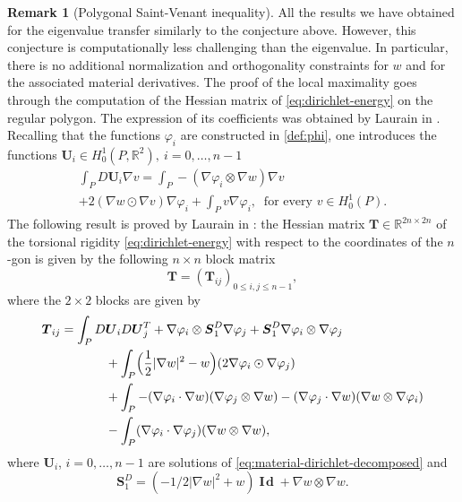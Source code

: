 \documentclass[JEP,XML,SOM,Unicode,ThmDefs,NoFloatCountersInSection,published]{cedram}
\theoremstyle{plain}
\theoremstyle{definition}
\newtheorem{rem}[thm]{Remark}
\newcommand{\bo}[1]{{\boldsymbol#1}}
\newcommand{\Id}{\operatorname{{\bo I\!\bo d}}}
\let\Bbb\mathbb
\begin{document}
\begin{rem}[Polygonal Saint-Venant inequality]
All the results we have obtained for the eigenvalue transfer similarly to the conjecture above. However, this conjecture is computationally less challenging than the eigenvalue. In particular, there is no additional normalization and orthogonality constraints for $w$ and for the associated material derivatives. The proof of the local maximality goes through the computation of the Hessian matrix of \eqref{eq:dirichlet-energy} on the regular polygon. The expression of its coefficients was obtained by Laurain in \cite{laurain2ndDeriv}.
Recalling that the functions $\varphi_i$ are constructed in \eqref{def:phi},
one introduces the functions $\bo U_i \in H_0^1(P,\Bbb{R}^2),\ i=0,\dots,n-1$
\vspace*{-5pt}
\begin{multline}
\int_P D\bo U_i \nabla v
= \int_P -(\nabla \varphi_i \otimes \nabla w)\nabla v\\[-8pt]
+ 2 (\nabla w \odot \nabla v)\nabla \varphi_i + \int_P v \nabla \varphi_i,\ \text{ for every } v \in H_0^1(P).
\label{eq:material-dirichlet-decomposed}
\end{multline}
The following result is proved by Laurain in \cite[Prop.\,14]{laurain2ndDeriv}: the Hessian matrix $\bo T \in \Bbb{R}^{2n\times 2n}$ of the torsional rigidity \eqref{eq:dirichlet-energy} with respect to the coordinates of the $n$-gon is given by the following $n\times n$ block matrix
\[
\bo T = (\bo T_{ij})_{0\leq i,j\leq n-1},
\]
where the $2\times 2$ blocks are given by
\begin{equation}
\label{eq:Hessian-Dir-block}
\begin{aligned}
\bo T_{ij} = \int_P D&\bo U_i D\bo U_j^T + \nabla \varphi_i \otimes \bo S_1^D \nabla \varphi_j + \bo S_1^D \nabla \varphi_i \otimes \nabla \varphi_j \\
& +\int_P \Bigl(\frac{1}{2}|\nabla w|^2 - w\Bigr) (2 \nabla \varphi_i \odot \nabla \varphi_j) \\
& +\int_P-(\nabla \varphi_i\cdot \nabla w)(\nabla \varphi_j \otimes \nabla w)-(\nabla \varphi_j \cdot \nabla w)(\nabla w \otimes \nabla \varphi_i) \\
&-\int_P(\nabla \varphi_i \cdot \nabla \varphi_j)(\nabla w \otimes \nabla w),
\end{aligned}
\end{equation}
where $\bo U_i$, $i=0,\dots,n-1$ are solutions of \eqref{eq:material-dirichlet-decomposed} and
\[
\bo S_1^D = (-1/2|\nabla w|^2 +w)\Id +\nabla w \otimes \nabla w.
\]
\end{rem}
\end{document}
